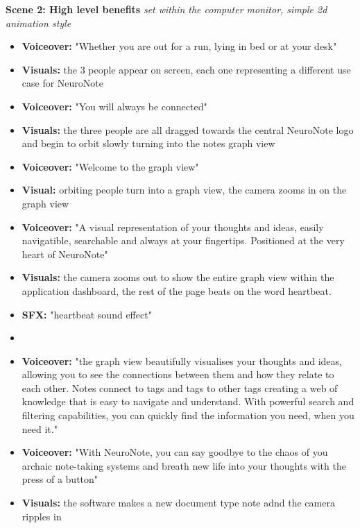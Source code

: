 \textbf{Scene 2: High level benefits}
\textit{set within the computer monitor, simple 2d animation style}
\begin{itemize}
    \item [0:30] \textbf{Voiceover:} "Whether you are out for a run, lying in bed or at your desk"
    \item \textbf{Visuals:} the 3 people appear on screen, each one representing a different use case for NeuroNote
    \item [0:30] \textbf{Voiceover:} "You will always be connected"
    \item \textbf{Visuals:} the three people are all dragged towards the central NeuroNote logo and begin to orbit slowly turning into the notes graph view
    \item [0:35] \textbf{Voiceover:} "Welcome to the graph view"
    \item [0:40] \textbf{Visual:} orbiting people turn into a graph view, the camera zooms in on the graph view
    \item [0:40] \textbf{Voiceover:} "A visual representation of your thoughts and ideas, easily navigatible, searchable and always at your fingertips. Positioned at the very heart of NeuroNote"
    \item [0:45] \textbf{Visuals:} the camera zooms out to show the entire graph view within the application dashboard, the rest of the page beats on the word heartbeat.
    \item [0:45] \textbf{SFX:} "heartbeat sound effect"
    \item \item [0:50] \textbf{Voiceover:} "the graph view beautifully visualises your thoughts and ideas, allowing you to see the connections between them and how they relate to each other. Notes connect to tags and tags to other tags creating a web of knowledge that is easy to navigate and understand. With powerful search and filtering capabilities, you can quickly find the information you need, when you need it."
    \item [0:50] \textbf{Voiceover:} "With NeuroNote, you can say goodbye to the chaos of you archaic note-taking systems and breath new life into your thoughts with the press of a button"
    \item [0:55] \textbf{Visuals:} the software makes a new document type note adnd the camera ripples in
\end{itemize}


